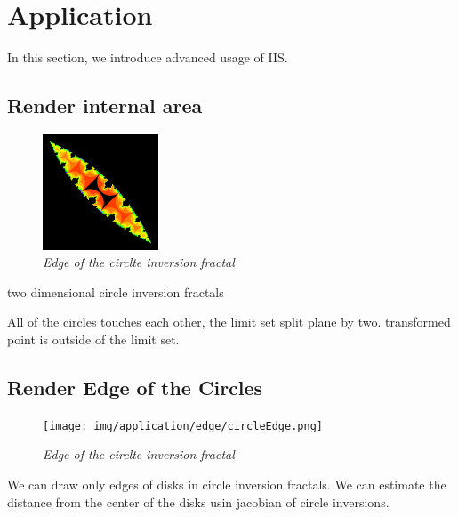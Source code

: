 
\section{Application}

In this section, we introduce advanced usage of IIS.

\subsection{Render internal area}

\begin{figure}[htbp]
  \center
  \includegraphics[height=1.35in, keepaspectratio]{img/application/internal/schottky.png}
  \caption{\textit{Edge of the circlte inversion fractal}}
  \label{fig:}
 \hspace*{\fill}
\end{figure}


two dimensional circle inversion fractals

All of the circles touches each other, the limit set split plane by two.
transformed point is outside of the limit set.

\subsection{Render Edge of the Circles}

\begin{figure}[htbp]
  \center
  \texttt{[image: img/application/edge/circleEdge.png]}
  \caption{\textit{Edge of the circlte inversion fractal}}
  \label{fig:circleEdge}
 \hspace*{\fill}
\end{figure}

We can draw only edges of disks in circle inversion fractals.
We can estimate the distance from the center of the disks usin jacobian
of circle inversions.


